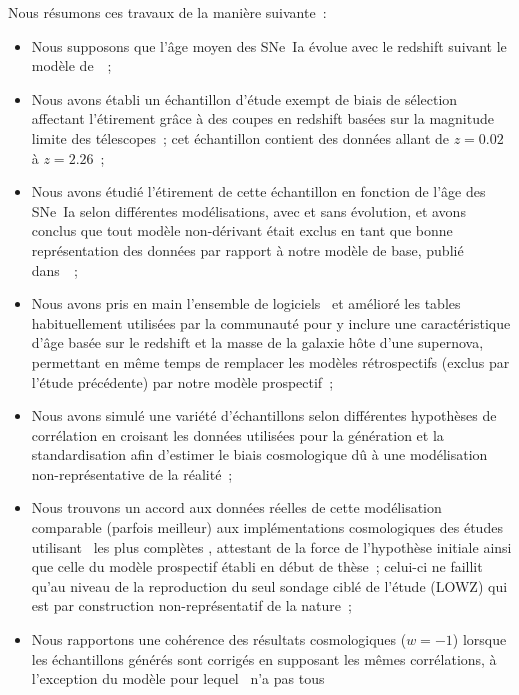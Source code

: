 \documentclass[../main/main.tex]{subfiles}
\begin{document}
Nous résumons ces travaux de la manière suivante~:
\begin{itemize}
    \item Nous supposons que l'âge moyen des SNe~Ia évolue avec le
        redshift suivant le modèle de~\cite{rigault2020}~;
    \item Nous avons établi un échantillon d'étude exempt de biais de sélection
        affectant l'étirement grâce à des coupes en redshift basées sur la
        magnitude limite des télescopes~; cet échantillon contient des données
        allant de $z = \num{0.02}$ à $z = \num{2.26}$~;
    \item Nous avons étudié l'étirement de cette échantillon en fonction de
        l'âge des SNe~Ia selon différentes modélisations, avec et sans
        évolution, et avons conclus que tout modèle non-dérivant était exclus en
        tant que bonne représentation des données par rapport à notre modèle de
        base, publié dans~\cite{nicolas2021}~;
    \item Nous avons pris en main l'ensemble de logiciels \snana\ et amélioré
        les tables habituellement utilisées par la communauté pour y inclure une
        caractéristique d'âge basée sur le redshift et la masse de la galaxie
        hôte d'une supernova, permettant en même temps de remplacer les modèles
        rétrospectifs (exclus par l'étude précédente) par notre modèle
        prospectif~;
    \item Nous avons simulé une variété d'échantillons selon différentes
        hypothèses de corrélation en croisant les données utilisées pour la
        génération et la standardisation afin d'estimer le biais cosmologique dû
        à une modélisation non-représentative de la réalité~;
    \item Nous trouvons un accord aux données réelles de cette modélisation
        comparable (parfois meilleur) aux implémentations cosmologiques des
        études utilisant \snana\ les plus complètes \citep{scolnic2016,
        scolnic2018, popovic2021a}, attestant de la force de l'hypothèse
        initiale ainsi que celle du modèle prospectif établi en début de thèse~;
        celui-ci ne faillit qu'au niveau de la reproduction du seul sondage
        ciblé de l'étude (LOWZ) qui est par construction non-représentatif de la
        nature~;
    \item Nous rapportons une cohérence des résultats cosmologiques ($w=-1$)
        lorsque les échantillons générés sont corrigés en supposant les mêmes
        corrélations, à l'exception du modèle pour lequel \snana\ n'a pas tous

\end{itemize}
\end{document}
